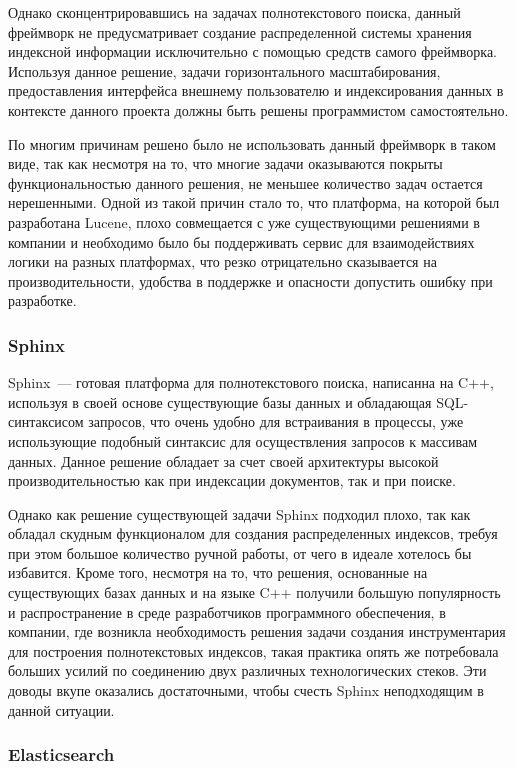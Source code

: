 Однако сконцентрировавшись на задачах полнотекстового поиска, данный фреймворк не предусматривает создание распределенной системы хранения индексной информации исключительно с помощью средств самого фреймворка. Используя данное решение, задачи горизонтального масштабирования, предоставления интерфейса внешнему пользователю и индексирования данных в контексте данного проекта должны быть решены программистом самостоятельно.

По многим причинам решено было не использовать данный фреймворк в таком виде, так как несмотря на то, что многие задачи оказываются покрыты функциональностью данного решения, не меньшее количество задач остается нерешенными. Одной из такой причин стало то, что платформа, на которой был разработана Lucene, плохо совмещается с уже существующими решениями в компании и необходимо было бы поддерживать сервис для взаимодействиях логики на разных платформах, что резко отрицательно сказывается на производительности, удобства в поддержке и опасности допустить ошибку при разработке.

\subsubsection{Sphinx}

Sphinx~--- готовая платформа для полнотекстового поиска, написанна на C++, используя в своей основе существующие базы данных и обладающая SQL-синтаксисом запросов, что очень удобно для встраивания в процессы, уже использующие подобный синтаксис для осуществления запросов к массивам данных. Данное решение обладает за счет своей архитектуры высокой производительностью как при индексации документов, так и при поиске.

Однако как решение существующей задачи Sphinx подходил плохо, так как обладал скудным функционалом для создания распределенных индексов, требуя при этом большое количество ручной работы, от чего в идеале хотелось бы избавится. Кроме того, несмотря на то, что решения, основанные на существующих базах данных и на языке C++ получили большую популярность и распространение в среде разработчиков программного обеспечения, в компании, где возникла необходимость решения задачи создания инструментария для построения полнотекстовых индексов, такая практика опять же потребовала больших усилий по соединению двух различных технологических стеков. Эти доводы вкупе оказались достаточными, чтобы счесть Sphinx неподходящим в данной ситуации.

\subsubsection{Elasticsearch}

